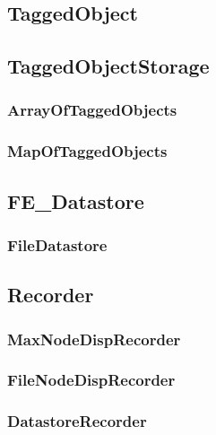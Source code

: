 \subsection{{\bf TaggedObject}}

\pagebreak

\subsection{{\bf TaggedObjectStorage}}

\pagebreak

\subsubsection{ ArrayOfTaggedObjects}

\pagebreak

\subsubsection{ MapOfTaggedObjects}

\pagebreak

\subsection{{\bf FE\_Datastore}}

\pagebreak

\pagebreak \subsubsection{FileDatastore}

\pagebreak

\subsection{{\bf Recorder}}

\pagebreak

\pagebreak \subsubsection{MaxNodeDispRecorder}

\pagebreak

\pagebreak \subsubsection{FileNodeDispRecorder}

\pagebreak

\pagebreak \subsubsection{DatastoreRecorder}

\pagebreak